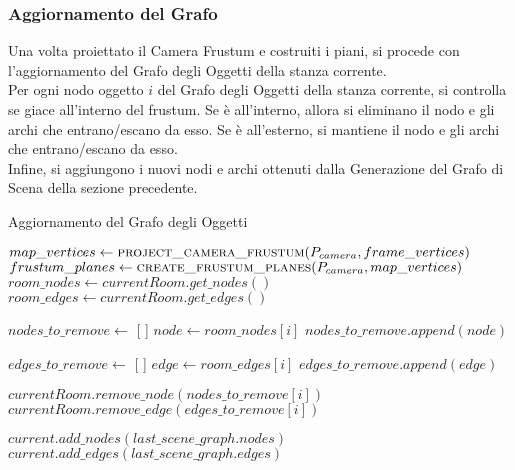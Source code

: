 \subsubsection{Aggiornamento del Grafo}
Una volta proiettato il Camera Frustum e costruiti i piani, si procede con l'aggiornamento del Grafo degli Oggetti della stanza corrente.\\
Per ogni nodo oggetto $i$ del Grafo degli Oggetti della stanza corrente, si controlla se giace all'interno del frustum. Se è all'interno, allora si eliminano il nodo e gli archi che entrano/escano da esso. Se è all'esterno, si mantiene il nodo e gli archi che entrano/escano da esso.\\
Infine, si aggiungono i nuovi nodi e archi ottenuti dalla Generazione del Grafo di Scena della sezione precedente.

\begin{algorithm}[H]
	\caption{Aggiornamento del Grafo degli Oggetti}
	\begin{algorithmic}[1]
		\State $map\_vertices \gets \Call{project\_camera\_frustum}{P_{camera}, frame\_vertices}$
		\State $frustum\_planes \gets \Call{create\_frustum\_planes}{P_{camera},map\_vertices}$
		\State $room\_nodes \gets currentRoom.get\_nodes()$
		\State $room\_edges \gets currentRoom.get\_edges()$

		\State $nodes\_to\_remove \gets$ [ ] 
		\State $node \gets room\_nodes[i]$
		\State $nodes\_to\_remove.append(node)$
		\EndIf
		\EndFor

		\State $edges\_to\_remove \gets$ [ ] 
		\State $edge \gets room\_edges[i]$
		\State $edges\_to\_remove.append(edge)$
		\EndIf
		\EndFor

		 
		\State $currentRoom.remove\_node(nodes\_to\_remove[i])$
		\EndFor
		\State $currentRoom.remove\_edge(edges\_to\_remove[i])$
		\EndFor

		\State $current.add\_nodes(last\_scene\_graph.nodes)$ 
		\State $current.add\_edges(last\_scene\_graph.edges)$
	\end{algorithmic}
\end{algorithm}


